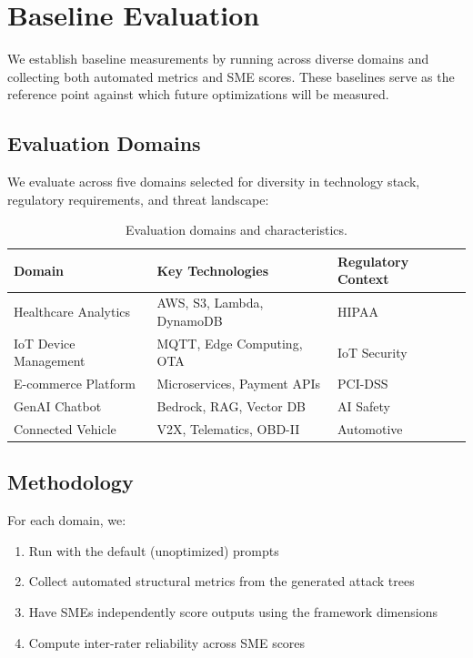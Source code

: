 \section{Baseline Evaluation}
\label{sec:baseline}

We establish baseline measurements by running \threatforest{} across diverse domains and collecting both automated metrics and SME scores. These baselines serve as the reference point against which future optimizations will be measured.

\subsection{Evaluation Domains}

We evaluate across five domains selected for diversity in technology stack, regulatory requirements, and threat landscape:

\begin{table}[t]
\centering
\caption{Evaluation domains and characteristics.}
\label{tab:domains}
\begin{tabular}{@{}lll@{}}
\toprule
\textbf{Domain} & \textbf{Key Technologies} & \textbf{Regulatory Context} \\
\midrule
Healthcare Analytics & AWS, S3, Lambda, DynamoDB & HIPAA \\
IoT Device Management & MQTT, Edge Computing, OTA & IoT Security \\
E-commerce Platform & Microservices, Payment APIs & PCI-DSS \\
GenAI Chatbot & Bedrock, RAG, Vector DB & AI Safety \\
Connected Vehicle & V2X, Telematics, OBD-II & Automotive \\
\bottomrule
\end{tabular}
\end{table}

\subsection{Methodology}

For each domain, we:
\begin{enumerate}
    \item Run \threatforest{} with the default (unoptimized) prompts
    \item Collect automated structural metrics from the generated attack trees
    \item Have  SMEs independently score outputs using the framework dimensions
    \item Compute inter-rater reliability across SME scores
\end{enumerate}

